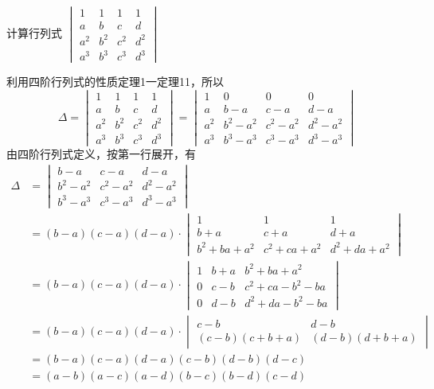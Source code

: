 \begin{example}
计算行列式
$\begin{vmatrix}
    1&1&1&1\\a&b&c&d\\
    a^2&b^2&c^2&d^2\\a^3&b^3&c^3&d^3
\end{vmatrix}$
\end{example}

\begin{solution}    
利用四阶行列式的性质定理1一定理11，所以
\[\Delta=\begin{vmatrix}
    1&1&1&1\\a&b&c&d\\
    a^2&b^2&c^2&d^2\\a^3&b^3&c^3&d^3 
\end{vmatrix}=\begin{vmatrix}
    1&0&0&0\\
    a&b-a&c-a&d-a\\
    a^2&b^2-a^2&c^2-a^2&d^2-a^2\\
    a^3&b^3-a^3&c^3-a^3&d^3-a^3
\end{vmatrix}\]
由四阶行列式定义，按第一行展开，有
\[\begin{split}
\Delta&=\begin{vmatrix}
    b-a&c-a&d-a\\
    b^2-a^2&c^2-a^2&d^2-a^2\\
    b^3-a^3&c^3-a^3&d^3-a^3
\end{vmatrix}\\
&=(b-a)(c-a)(d-a)\cdot \begin{vmatrix}
   1&1&1\\
   b+a&c+a&d+a\\b^2+ba+a^2&c^2+ca+a^2&d^2+da+a^2 
\end{vmatrix}   \\
&= (b-a)(c-a)(d-a)\cdot \begin{vmatrix}
    1&b+a&b^2+ba+a^2\\
    0&c-b&c^2+ca-b^2-ba\\
    0&d-b&d^2+da -b^2-ba
 \end{vmatrix}   \\
 &= (b-a)(c-a)(d-a)\cdot \begin{vmatrix}
    c-b&d-b\\
    (c-b)(c+b+a)&  (d-b)(d+b+a)
 \end{vmatrix}   \\
 &=(b-a)(c-a)(d-a)(c-b)(d-b)(d-c)\\
&=(a-b)(a-c)(a-d)(b-c)(b-d)(c-d)
\end{split}\]
\end{solution}

